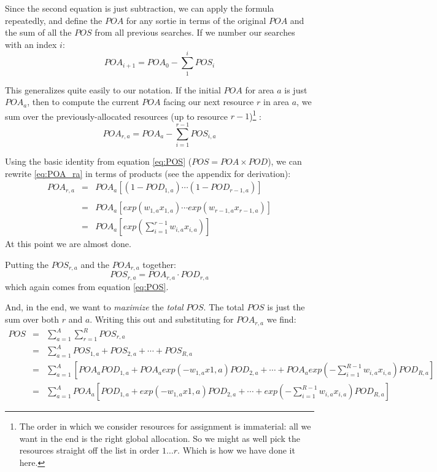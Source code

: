 \documentclass[10pt]{article}
\begin{document}
Since the second equation is just subtraction, we can apply the
formula repeatedly, and define the $POA$ for any sortie in terms of
the original $POA$ and the sum of all the $POS$ from all previous
searches. If we number our searches with an index $i$:
\begin{equation}
  \label{eq:POA2'}
  POA_{i+1} = POA_0 - \sum_1^i POS_i
\end{equation}


This generalizes quite easily to our notation. If the initial $POA$
for area $a$ is just $POA_a$, then to compute the current $POA$ facing
our next resource $r$ in area $a$, we sum over the
previously-allocated resources (up to resource $r-1$)\footnote{
  The order in which we consider resources for assignment is
  immaterial: all we want in the end is the right global allocation.
  So we might as well pick the resources straight off the list in
  order $1 \ldots r$. Which is how we have done it here.}
:
\begin{equation}
  \label{eq:POA_ra}
  POA_{r,a} = POA_a - \sum_{i=1}^{r-1}POS_{i,a}
\end{equation}

Using the basic identity from equation \ref{eq:POS} ($POS =
POA \times POD$), we can
rewrite \ref{eq:POA_ra} in terms of products (see the appendix for derivation):
\begin{eqnarray}
  \label{eq:15}
  \nonumber POA_{r,a} &=& POA_a \left[(1-POD_{1,a})\cdots(1-POD_{r-1,a})\right]\\
                   & & \\
  \nonumber &=& POA_a \left[exp(w_{1,a}x_{1,a}) \cdots exp(w_{r-1,a}x_{r-1,a})\right]\\
  \nonumber &=& POA_a \left[exp\left(\sum_{i=1}^{r-1}w_{i,a}x_{i,a}\right)\right]
\end{eqnarray}
At this point we are almost done.

Putting the $POS_{r,a}$ and the $POA_{r,a}$ together:
\begin{equation}
  \label{eq:POS2_ra}
  POS_{r,a} = POA_{r,a} \cdot POD_{r,a}
\end{equation}
which again comes from equation \ref{eq:POS}. 

And, in the end, we want to \emph{maximize} the \emph{total}
$POS$. The total $POS$ is just the sum over both $r$ and $a$. Writing
this out and substituting for $POA_{r,a}$ we find:
\begin{eqnarray}
  \label{eq:POS_tot}
  POS &=& \sum_{a=1}^A \sum_{r=1}^R POS_{r,a}\\
  \nonumber &=& \sum_{a=1}^A POS_{1,a} + POS_{2,a} + \cdots + POS_{R,a}\\
  \nonumber &=& \sum_{a=1}^A \left[
    POA_a POD_{1,a} +
    POA_a exp(-w_{1,a}x{1,a}) POD_{2,a} + \cdots + 
    POA_a exp\left(-\sum_{i=1}^{R-1}w_{i,a}x_{i,a}\right) POD_{R,a} 
    \right]\\
   &=& \sum_{a=1}^A POA_a \left[
     POD_{1,a} +
     exp(-w_{1,a}x{1,a}) POD_{2,a}+ \cdots + 
     exp\left(-\sum_{i=1}^{R-1}w_{i,a}x_{i,a}\right) POD_{R,a}
     \right]
\end{eqnarray}
\end{document}
